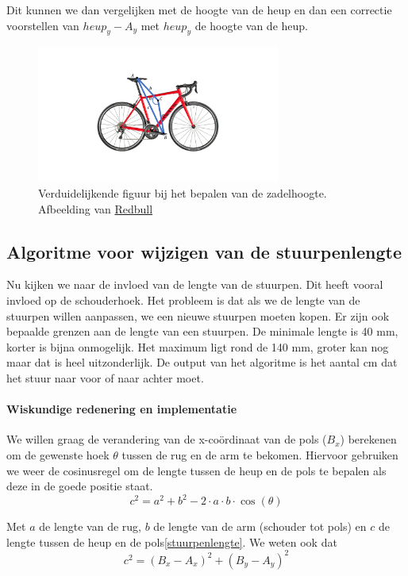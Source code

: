 \documentclass[a4paper,twoside,kulak]{kulakreport}
\begin{document}
Dit kunnen we dan vergelijken met de hoogte van de heup en dan een correctie voorstellen van \(heup_y - A_y\) met \(heup_y\) de hoogte van de heup.
\begin{figure}[H]
	\begin{center}
		\includegraphics[width=8cm]{fiets.pdf}
	\end{center}
	\caption{Verduidelijkende figuur bij het bepalen van de zadelhoogte. Afbeelding van \href{redbull.com}{Redbull}}
	\label{fiets}
\end{figure}

\subsection{Algoritme voor wijzigen van de stuurpenlengte}

Nu kijken we naar de invloed van de lengte van de stuurpen. Dit heeft vooral invloed op de schouderhoek. Het probleem is dat als we de lengte van de stuurpen willen aanpassen, we een nieuwe stuurpen moeten kopen. Er zijn ook bepaalde grenzen aan de lengte van een stuurpen. De minimale lengte is 40 \si{mm}, korter is bijna onmogelijk. Het maximum ligt rond de 140 \si{mm}, groter kan nog maar dat is heel uitzonderlijk. De output van het algoritme is het aantal \si{cm} dat het stuur naar voor of naar achter moet.


\paragraph{Wiskundige redenering en implementatie}


We willen graag de verandering van de x-coördinaat van de pols (\(B_x\)) berekenen om de gewenste hoek $\theta$ tussen de rug en de arm te bekomen. Hiervoor gebruiken we weer de cosinusregel om de lengte tussen de heup en de pols te bepalen als deze in de goede positie staat.
\[c^2 = a^2 + b^2 -2\cdot a\cdot b\cdot \cos(\theta)\]

Met \(a\) de lengte van de rug, \(b\) de lengte van de arm (schouder tot pols) en \(c\) de lengte tussen de heup en de pols\ref{stuurpenlengte}. We weten ook dat
\[c^2 = (B_x - A_x)^2 + (B_y - A_y)^2\]
\end{document}

